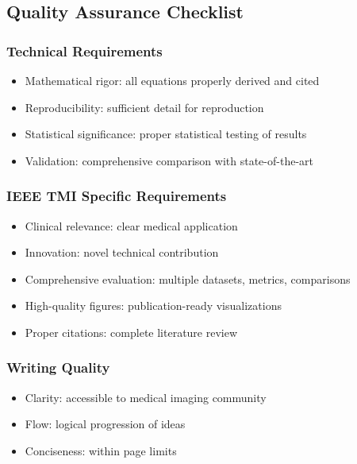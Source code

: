 \documentclass[journal,twoside,web]{ieeecolor}
\begin{document}
\subsection{Quality Assurance Checklist}

\subsubsection{Technical Requirements}
\begin{itemize}
    \item Mathematical rigor: all equations properly derived and cited
    \item Reproducibility: sufficient detail for reproduction
    \item Statistical significance: proper statistical testing of results
    \item Validation: comprehensive comparison with state-of-the-art
\end{itemize}

\subsubsection{IEEE TMI Specific Requirements}
\begin{itemize}
    \item Clinical relevance: clear medical application
    \item Innovation: novel technical contribution
    \item Comprehensive evaluation: multiple datasets, metrics, comparisons
    \item High-quality figures: publication-ready visualizations
    \item Proper citations: complete literature review
\end{itemize}

\subsubsection{Writing Quality}
\begin{itemize}
    \item Clarity: accessible to medical imaging community
    \item Flow: logical progression of ideas
    \item Conciseness: within page limits
\end{itemize}
\end{document}
